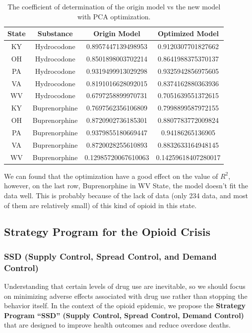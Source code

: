 \documentclass{mcmthesis}
\begin{document}
\begin{table}[H]
    \centering
    \begin{tabular}{|c|c|c|c|}
        \hline
        State & Substance & Origin Model & Optimized Model \\\hline
        KY & Hydrocodone & 0.8957447139498953 & 0.9120307701827662 \\
        OH & Hydrocodone & 0.8501898003702214 & 0.8641988375370137 \\
        PA & Hydrocodone & 0.9319499913029298 & 0.9325942856975605 \\
        VA & Hydrocodone & 0.8191016628092015 & 0.8374162880363936 \\
        WV & Hydrocodone & 0.6797258899970731 & 0.7051639551372615 \\
        KY & Buprenorphine & 0.7697562356106809 & 0.7998899587972155 \\
        OH & Buprenorphine & 0.8720902736185301 & 0.8807783772009824 \\
        PA & Buprenorphine & 0.9379855180669447 & 0.94186265136905 \\
        VA & Buprenorphine & 0.8720028255610893 & 0.8832633164948145 \\
        WV & Buprenorphine & 0.12985720067610063 & 0.14259618407280017 \\
        \hline 
    \end{tabular}
    \caption{The coefficient of determination of the origin model vs the new model with PCA optimization.}
    \label{tab:final}
\end{table}

We can found that the optimization have a good effect on the value of $R^2$, however, on the last row, Buprenorphine in WV State, the model doesn't fit the data well. This is probably because of the lack of data (only 234 data, and most of them are relatively small) of this kind of opioid in this state.

\subsection{Strategy Program for the Opioid Crisis}\label{Sec:Strategy}

\subsubsection{SSD (Supply Control, Spread Control, and Demand Control) }
	
	Understanding that certain levels of drug use are inevitable, so we should focus on minimizing adverse effects associated with drug use rather than stopping the behavior itself. In the context of the opioid epidemic, we propose the \textbf{Strategy Program ``SSD'' (Supply Control, Spread Control, Demand Control)} that are designed to improve health outcomes and reduce overdose deaths.
	
\end{document}
